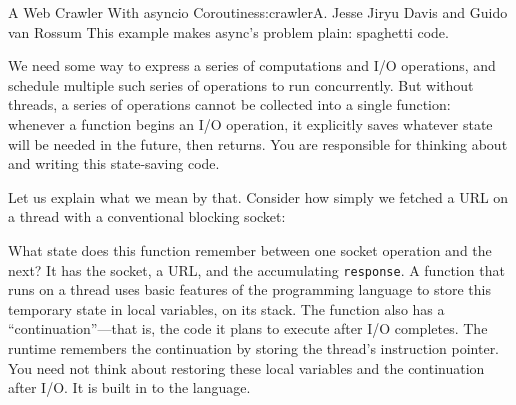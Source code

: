 \begin{aosachapter}{A Web Crawler With asyncio Coroutines}{s:crawler}{A. Jesse Jiryu Davis and Guido van Rossum}
This example makes async's problem plain: spaghetti code.

We need some way to express a series of computations and I/O operations,
and schedule multiple such series of operations to run concurrently. But
without threads, a series of operations cannot be collected into a
single function: whenever a function begins an I/O operation, it
explicitly saves whatever state will be needed in the future, then
returns. You are responsible for thinking about and writing this
state-saving code.

Let us explain what we mean by that. Consider how simply we fetched a
URL on a thread with a conventional blocking socket:

\begin{Shaded}
\begin{Highlighting}[]
 
    \NormalTok{((}\NormalTok{, }\NormalTok{))}
    \NormalTok{))}
    \NormalTok{)}
     
        \NormalTok{)}
    
\end{Highlighting}
\end{Shaded}

What state does this function remember between one socket operation and
the next? It has the socket, a URL, and the accumulating
\texttt{response}. A function that runs on a thread uses basic features
of the programming language to store this temporary state in local
variables, on its stack. The function also has a ``continuation''---that
is, the code it plans to execute after I/O completes. The runtime
remembers the continuation by storing the thread's instruction pointer.
You need not think about restoring these local variables and the
continuation after I/O. It is built in to the language.


\end{aosachapter}
